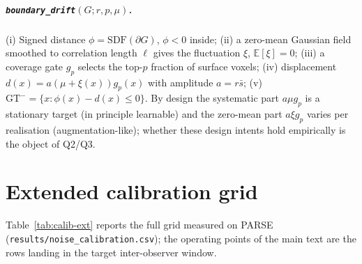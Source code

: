 \documentclass[
    bookmarks, bookmarksnumbered, bookmarksopen,
    colorlinks=true, citecolor=blue, linkcolor=blue, urlcolor=blue
]{techrep}
\newcommand{\gtminus}{\ensuremath{\mathrm{GT}^{\!-}}}
\newcommand{\E}{\ensuremath{\mathbb{E}}}
\begin{document}
\paragraph{\texttt{boundary\_drift}$(G;r,p,\mu)$.} (i) Signed distance $\phi=\text{SDF}(\partial G)$,
$\phi<0$ inside; (ii) a zero-mean Gaussian field smoothed to correlation length $\ell$ gives the
fluctuation $\xi$, $\E[\xi]=0$; (iii) a coverage gate $g_p$ selects the top-$p$ fraction of
surface voxels; (iv) displacement $d(x)=a(\mu+\xi(x))g_p(x)$ with amplitude $a=r\bar s$;
(v) $\gtminus=\{x:\phi(x)-d(x)\le 0\}$. By design the systematic part $a\mu g_p$ is a
stationary target (in principle learnable) and the zero-mean part $a\xi g_p$ varies per
realisation (augmentation-like); whether these design intents hold empirically is the object of
Q2/Q3.

\chapter{Extended calibration grid}\label{app:calib}
Table~\ref{tab:calib-ext} reports the full grid measured on PARSE
(\texttt{results/noise\_calibration.csv}); the operating points of the main text are the rows
landing in the target inter-observer window.
\end{document}
